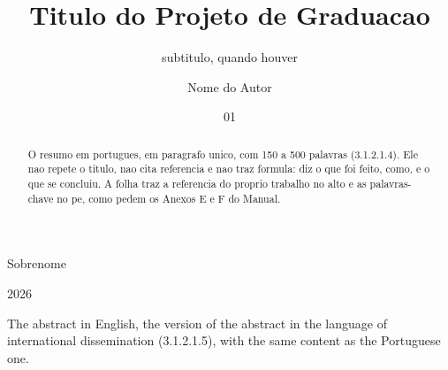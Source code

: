\documentclass[grad]{ufrj}
\begin{document}
  \title{Titulo do Projeto de Graduacao}
  \subtitle{subtitulo, quando houver}
  \author{Nome do Autor}{Sobrenome}
  \date{01}{2026}

  \maketitle
  \frontmatter

  \dedication{A quem leu a norma antes de escrever.}


  \begin{abstract}
    O resumo em portugues, em paragrafo unico, com 150 a 500 palavras
    (3.1.2.1.4). Ele nao repete o titulo, nao cita referencia e nao traz
    formula: diz o que foi feito, como, e o que se concluiu. A folha traz a
    referencia do proprio trabalho no alto e as palavras-chave no pe, como
    pedem os Anexos E e F do Manual.
  \end{abstract}

  \begin{foreignabstract}
    The abstract in English, the version of the abstract in the language of
    international dissemination (3.1.2.1.5), with the same content as the
    Portuguese one.
  \end{foreignabstract}
\end{document}
